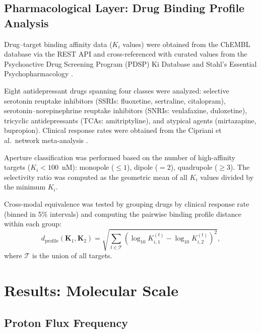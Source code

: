 \documentclass[twocolumn,10pt]{article}
\begin{document}
\subsection{Pharmacological Layer: Drug Binding Profile Analysis}
\label{sec:methods_pharma}

Drug--target binding affinity data ($K_{i}$ values) were obtained from the ChEMBL database \citep{gaulton2012chembl} via the REST API and cross-referenced with curated values from the Psychoactive Drug Screening Program (PDSP) Ki Database and Stahl's Essential Psychopharmacology \citep{stahl2021essential}.

Eight antidepressant drugs spanning four classes were analyzed: selective serotonin reuptake inhibitors (SSRIs: fluoxetine, sertraline, citalopram), serotonin--norepinephrine reuptake inhibitors (SNRIs: venlafaxine, duloxetine), tricyclic antidepressants (TCAs: amitriptyline), and atypical agents (mirtazapine, bupropion).  Clinical response rates were obtained from the Cipriani et al.\ network meta-analysis \citep{cipriani2018comparative}.

Aperture classification was performed based on the number of high-affinity targets ($K_{i} < 100$~nM): monopole ($\leq 1$), dipole ($= 2$), quadrupole ($\geq 3$).  The selectivity ratio was computed as the geometric mean of all $K_{i}$ values divided by the minimum $K_{i}$.

Cross-modal equivalence was tested by grouping drugs by clinical response rate (binned in 5\% intervals) and computing the pairwise binding profile distance within each group:
\begin{equation}
  d_{\mathrm{profile}}(\mathbf{K}_{1}, \mathbf{K}_{2}) = \sqrt{\sum_{t \in \mathcal{T}} \left(\log_{10} K_{i,1}^{(t)} - \log_{10} K_{i,2}^{(t)}\right)^{2}},
  \label{eq:binding_distance}
\end{equation}
where $\mathcal{T}$ is the union of all targets.

\section{Results: Molecular Scale}
\label{sec:molecular}

\subsection{Proton Flux Frequency}
\end{document}
